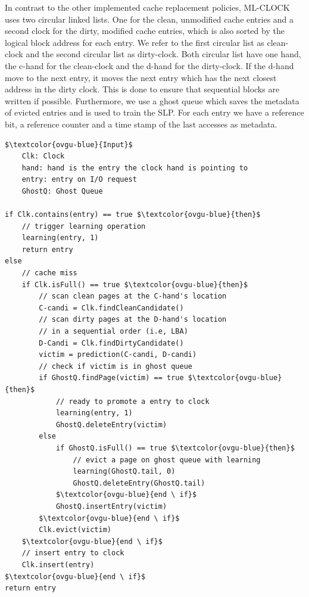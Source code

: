 \documentclass[
	12pt,
	a4paper,
	abstract,
	bibliography=totoc,
	chapterprefix,
	headings=openright,
	numbers=endperiod,
	parskip=half,
	twoside,
]{scrreprt}
\begin{document}
In contrast to the other implemented cache replacement policies,
ML-CLOCK uses two circular linked lists.
One for the clean, unmodified cache entries
and a second clock for the dirty, modified cache entries, which is also sorted by 
the logical block address for each entry.
We refer to the first circular list as clean-clock and the second circular list as 
dirty-clock.
Both circular list have one hand, the c-hand for the clean-clock and 
the d-hand for the dirty-clock.
If the d-hand move to the next entry, it moves the next entry 
which has the next closest address in the dirty clock.
This is done to ensure that sequential blocks are written if possible.
Furthermore, we use a ghost queue which saves the metadata of evicted entries and 
is used to train the SLP.
For each entry we have a reference bit, a reference counter and a time stamp of the 
last accesses as metadata. 






\bigskip

\begin{lstlisting}[mathescape=true,caption=K-Clock replacement algorithm in pseudocode,label=lst:ml-clock-algorithm]
$\textcolor{ovgu-blue}{Input}$
	Clk: Clock
	hand: hand is the entry the clock hand is pointing to
	entry: entry on I/O request
	GhostQ: Ghost Queue

if Clk.contains(entry) == true $\textcolor{ovgu-blue}{then}$
	// trigger learning operation
	learning(entry, 1)
	return entry
else
	// cache miss
	if Clk.isFull() == true $\textcolor{ovgu-blue}{then}$
		// scan clean pages at the C-hand's location
		C-candi = Clk.findCleanCandidate()
		// scan dirty pages at the D-hand's location
		// in a sequential order (i.e, LBA)
		D-Candi = Clk.findDirtyCandidate()
		victim = prediction(C-candi, D-candi)
		// check if victim is in ghost queue
		if GhostQ.findPage(victim) == true $\textcolor{ovgu-blue}{then}$
			// ready to promote a entry to clock
			learning(entry, 1)
			GhostQ.deleteEntry(victim)
		else
			if GhostQ.isFull() == true $\textcolor{ovgu-blue}{then}$
				// evict a page on ghost queue with learning
				learning(GhostQ.tail, 0)
				GhostQ.deleteEntry(GhostQ.tail)
			$\textcolor{ovgu-blue}{end \ if}$
			GhostQ.insertEntry(victim)
		$\textcolor{ovgu-blue}{end \ if}$
		Clk.evict(victim)
	$\textcolor{ovgu-blue}{end \ if}$
	// insert entry to clock
	Clk.insert(entry)
$\textcolor{ovgu-blue}{end \ if}$
return entry 
\end{lstlisting}
\end{document}
